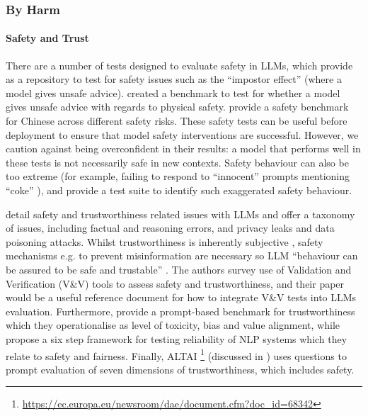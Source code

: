 \subsubsection{By Harm}
\paragraph{Safety and Trust}
There are a number of tests designed to evaluate safety in LLMs, which \citet{dinan_safetykit_2022} provide as a repository to test for safety issues such as the ``impostor effect'' (where a model gives unsafe advice). \citet{levy_safetext_2022} created a benchmark to test for whether a model gives unsafe advice with regards to physical safety. \citet{sun_safety_2023} provide a safety benchmark for Chinese across different safety risks. These safety tests can be useful before deployment to ensure that model safety interventions are successful. However, we caution against being overconfident in their results: a model that performs well in these tests is not necessarily safe in new contexts. Safety behaviour can also be too extreme (for example, failing to respond to ``innocent'' prompts mentioning ``coke'' \citep{rottger_xstest_2024}), and \citet{rottger_xstest_2024} provide a test suite to identify such exaggerated safety behaviour. 

\citet{huang_survey_2023} detail safety and trustworthiness related issues with LLMs and offer a taxonomy of issues, including factual and reasoning errors, and privacy leaks and data poisoning attacks. Whilst trustworthiness is inherently subjective \citep{knowles_trustworthy_2023}, safety mechanisms e.g. to prevent misinformation are necessary so LLM ``behaviour can be assured to be safe and trustable'' \citep{huang_survey_2023}. The authors survey use of Validation and Verification (V\&V) tools to assess safety and trustworthiness, and their paper would be a useful reference document for how to integrate V\&V tests into LLMs evaluation.  Furthermore, \citet{huang_trustgpt_2023} provide a prompt-based benchmark for trustworthiness which they operationalise as level of toxicity, bias and value alignment, while \citet{tan_reliability_2021} propose a six step framework for testing reliability of NLP systems which they relate to safety and fairness. Finally, ALTAI \footnote{\url{https://ec.europa.eu/newsroom/dae/document.cfm?doc_id=68342}} (discussed in ) uses questions to prompt evaluation of seven dimensions of trustworthiness, which includes safety.

